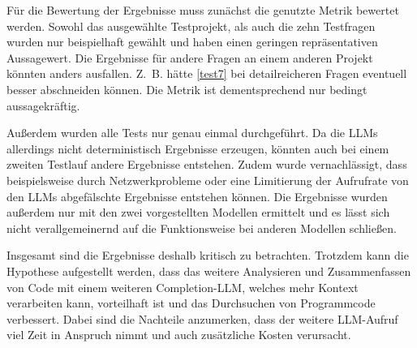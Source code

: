 \documentclass[../main.tex]{subfiles}
\begin{document}
Für die Bewertung der Ergebnisse muss zunächst die genutzte Metrik bewertet werden.
Sowohl das ausgewählte Testprojekt, als auch die zehn Testfragen wurden nur beispielhaft gewählt und haben einen geringen repräsentativen Aussagewert.
Die Ergebnisse für andere Fragen an einem anderen Projekt könnten anders ausfallen.
Z. B. hätte \ref{test7} bei detailreicheren Fragen eventuell besser abschneiden können.
Die Metrik ist dementsprechend nur bedingt aussagekräftig.

Außerdem wurden alle Tests nur genau einmal durchgeführt. 
Da die \glspl{LLM} allerdings nicht deterministisch Ergebnisse erzeugen, könnten auch bei einem zweiten Testlauf andere Ergebnisse entstehen.
Zudem wurde vernachlässigt, dass beispielsweise durch Netzwerkprobleme oder eine Limitierung der Aufrufrate von den \glspl{LLM} abgefälschte Ergebnisse entstehen können.
Die Ergebnisse wurden außerdem nur mit den zwei vorgestellten Modellen ermittelt und es lässt sich nicht verallgemeinernd auf die Funktionsweise bei anderen Modellen schließen.

Insgesamt sind die Ergebnisse deshalb kritisch zu betrachten.
Trotzdem kann die Hypothese aufgestellt werden, dass das weitere Analysieren und Zusammenfassen von Code mit einem weiteren Completion-\gls{LLM}, welches mehr Kontext verarbeiten kann, vorteilhaft ist und das Durchsuchen von Programmcode verbessert.
Dabei sind die Nachteile anzumerken, dass der weitere \gls{LLM}-Aufruf viel Zeit in Anspruch nimmt und auch zusätzliche Kosten verursacht. 
\end{document}
